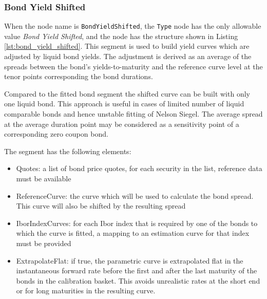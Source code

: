 \subsubsection*{Bond Yield Shifted}
\label{sec:bond_yield_shifted}

When the node name is \lstinline!BondYieldShifted!, the \lstinline!Type! node has the only allowable value \emph{Bond Yield Shifted},
and the node has the structure shown in Listing \ref{lst:bond_yield_shifted}. This segment is used to build yield
curves which are adjusted by liquid bond yields. The adjustment is derived as an average of the spreads between the bond's
yields-to-maturity and the reference curve level at the tenor points corresponding the bond durations.

Compared to the fitted bond segment the shifted curve can be built with only one liquid bond. This approach is useful in
cases of limited number of liquid comparable bonds and hence unstable fitting of Nelson Siegel. The average spread
at the average duration point may be considered as a sensitivity point of a corresponding zero coupon bond.

The segment has the following elements:

\begin{itemize}
  \item Quotes: a list of bond price quotes, for each security in the list, reference data must be available
  \item ReferenceCurve: the curve which will be used to calculate the bond spread. This curve will also be shifted by the resulting spread
  \item IborIndexCurves: for each Ibor index that is required by one of the bonds to which the curve is fitted, a mapping
    to an estimation curve for that index must be provided
  \item ExtrapolateFlat: if true, the parametric curve is extrapolated flat in the instantaneous forward rate before the
    first and after the last maturity of the bonds in the calibration basket. This avoids unrealistic rates at the short
    end or for long maturities in the resulting curve.
  \end{itemize}

